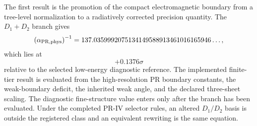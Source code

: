 \documentclass[11pt]{article}
\begin{document}
The first result is the promotion of the compact electromagnetic boundary from a tree-level normalization to a radiatively corrected precision quantity.  The \(D_1+D_2\) branch gives
\begin{equation}
\left(\alpha_{\rm PR,phys}\right)^{-1}
=
137.0359992075134149588913461016165946\ldots ,
\end{equation}
which lies at
\begin{equation}
+0.1376\sigma
\end{equation}
relative to the selected low-energy diagnostic reference.  The implemented
finite-tier result is evaluated from the high-resolution PR boundary
constants, the weak-boundary deficit, the inherited weak angle, and the
declared three-sheet scaling.  The diagnostic fine-structure value enters only
after the branch has been evaluated.  Under the completed PR-IV selector
rules, an altered $D_1/D_2$ basis is outside the registered class and an
equivalent rewriting is the same equation.
\end{document}
